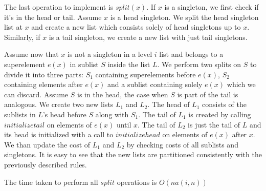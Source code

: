 The last operation to implement is $split(x)$. If $x$ is a singleton, we first check if it's in the head or tail. Assume $x$ is a head singleton. We split the head singleton list at $x$ and create a new list which consists solely of head singletons up to $x$. Similarly, if $x$ is a tail singleton, we create a new list with just tail singletons.

Assume now that $x$ is not a singleton in a level $i$ list and belongs to a superelement $e(x)$ in sublist $S$ inside the list $L$. We perform two splits on $S$ to divide it into three parts: $S_1$ containing superelements before $e(x)$, $S_2$ containing elements after $e(x)$ and a sublist containing solely $e(x)$ which we can discard. Assume $S$ is in the head, the case when $S$ is part of the tail is analogous. We create two new lists $L_1$ and $L_2$. The head of $L_1$ consists of the sublists in $L$'s head before $S$ along with $S_1$. The tail of $L_1$ is created by calling $initializetail$ on elements of $e(x)$ until $x$. The tail of $L_2$ is just the tail of $L$ and its head is initialized with a call to $initializehead$ on elements of $e(x)$ after $x$. We than update the cost of $L_1$ and $L_2$ by checking costs of all sublists and singletons. It is easy to see that the new lists are partitioned consistently with the previously described rules.

\begin{theorem}
    The time taken to perform all $split$ operations is $O(na(i,n))$
\end{theorem}

